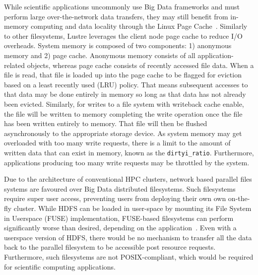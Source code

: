 \documentclass{report}
\begin{document}
    While scientific applications uncommonly use Big Data frameworks and must perform
    large over-the-network data transfers, they may still benefit from in-memory
    computing and data locality through the Linux Page Cache~\cite{pagecache}. Similarly to other
    filesystems, Lustre leverages the client node page cache to reduce I/O overheads.
    System memory is composed of two components: 1) anonymous memory and 2) page cache.
    Anonymous memory consists of all application-related objects, whereas page cache
    consists of recently accessed file data. When a file is read, that file is loaded
    up into the page cache to be flagged for eviction based on a least recently used (LRU)
    policy. That means subsequent accesses to that data may be done entirely
    in memory so long as that data has not already been evicted. Similarly, for writes
    to a file system with writeback cache enable, the file will be written to memory
    completing the write operation once the file has been written entirely to memory.
    That file will then be flushed asynchronously to the appropriate storage device.
    As system memory may get overloaded with too many write requests, there is a limit to the amount of written data that
    can exist in memory, known as the \texttt{dirtyi\_ratio}. Furthermore, applications
    producing too many write requests may be throttled by the system.


    Due to the architecture of conventional HPC clusters, network based parallel
    files systems are favoured over Big Data distributed filesystems. Such filesystems
    require super user access, preventing users from deploying their own own on-the-fly cluster.
    While HDFS can be loaded in user-space by mounting its File System in Userspace (FUSE) implementation,
    FUSE-based filesystems can perform significantly worse than desired, depending on the application~\cite{tofuse}.
    Even with a userspace version of HDFS, there would
    be no mechanism to transfer all the data back to the parallel filesystem to be accessible
    post resource requests. Furthermore, such filesystems are not POSIX-compliant, which
    would be required for scientific computing applications.
\end{document}
